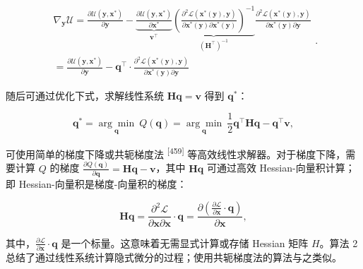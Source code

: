\begin{equation}
\begin{array}{l} \nabla_ {\boldsymbol {y}} \mathcal {U} = \frac {\partial \mathcal {U} (\boldsymbol {y} , \boldsymbol {x} ^ {*})}{\partial \boldsymbol {y}} - \underbrace {\frac {\partial \mathcal {U} (\boldsymbol {y} , \boldsymbol {x} ^ {*})}{\partial \boldsymbol {x} ^ {*}}} _ {\boldsymbol {v} ^ {\top}} \underbrace {\left(\frac {\partial^ {2} \mathcal {L} (\boldsymbol {x} ^ {*} (\boldsymbol {y}) , \boldsymbol {y})}{\partial \boldsymbol {x} ^ {*} (\boldsymbol {y}) \partial \boldsymbol {x} ^ {*} (\boldsymbol {y})}\right) ^ {- 1}} _ {(\boldsymbol {H} ^ {\top}) ^ {- 1}} \frac {\partial^ {2} \mathcal {L} (\boldsymbol {x} ^ {*} (\boldsymbol {y}) , \boldsymbol {y})}{\partial \boldsymbol {x} ^ {*} (\boldsymbol {y}) \partial \boldsymbol {y}} \\ = \frac {\partial \mathcal {U} (\boldsymbol {y} , \boldsymbol {x} ^ {*})}{\partial \boldsymbol {y}} - \boldsymbol {q} ^ {\top} \cdot \frac {\partial^ {2} \mathcal {L} (\boldsymbol {x} ^ {*} (\boldsymbol {y}) , \boldsymbol {y})}{\partial \boldsymbol {x} ^ {*} (\boldsymbol {y}) \partial \boldsymbol {y}} \end{array} .\tag{4.13}
\end{equation}

随后可通过优化下式，求解线性系统 $\pmb{H}\pmb{q} = \pmb{v}$ 得到 $\pmb{q}^{*}$：

\begin{equation}
\boldsymbol {q} ^ {*} = \underset {\boldsymbol {q}} {\arg\min}\ Q (\boldsymbol {q}) = \underset {\boldsymbol {q}} {\arg\min}\ \frac {1}{2} \boldsymbol {q} ^ {\top} \boldsymbol {H} \boldsymbol {q} - \boldsymbol {q} ^ {\top} \boldsymbol {v},\tag{4.14}
\end{equation}

可使用简单的梯度下降或共轭梯度法 \textsuperscript{[459]} 等高效线性求解器。对于梯度下降，需要计算 $Q$ 的梯度 $\frac{\partial Q(\pmb{q})}{\partial \pmb{q}} = \pmb{H}\pmb{q} - \pmb{v}$，其中 $\pmb{H}\pmb{q}$ 可通过高效 Hessian-向量积计算；即 Hessian-向量积是梯度-向量积的梯度：

\begin{equation}
\pmb {H} \pmb {q} = \frac {\partial^ {2} \mathcal {L}}{\partial \pmb {x} \partial \pmb {x}} \cdot \pmb {q} = \frac {\partial (\frac {\partial \mathcal {L}}{\partial \pmb {x}} \cdot \pmb {q})}{\partial \pmb {x}},\tag{4.15}
\end{equation}

其中，$\textstyle { \frac { \partial { \mathcal { L } } } { \partial { \boldsymbol { x } } } } \cdot { \boldsymbol { q } }$ 是一个标量。这意味着无需显式计算或存储 Hessian 矩阵 $H$。算法 2 总结了通过线性系统计算隐式微分的过程；使用共轭梯度法的算法与之类似。

